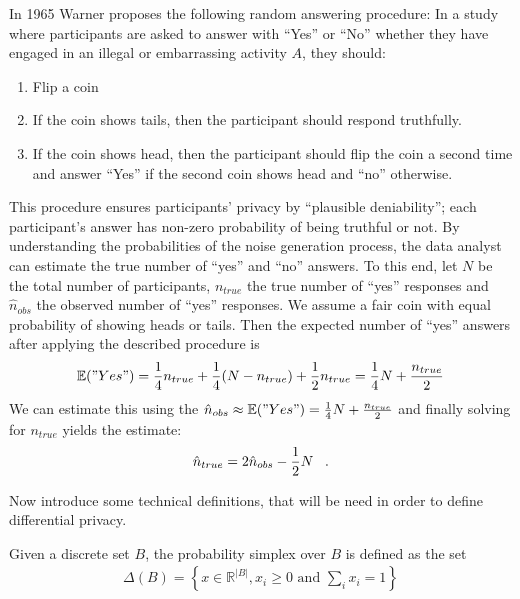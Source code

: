 \begin{ex} \label{ex:rand_resp}
    In 1965 Warner \parencite{stan65rr} proposes the following random answering procedure: In a study where participants are asked to answer with ``Yes'' or ``No'' whether they have engaged in an illegal or embarrassing activity $A$, they should:
    \begin{enumerate}
        \item Flip a coin
        \item If the coin shows tails, then the participant should respond truthfully.
        \item If the coin shows head, then the participant should flip the coin a second time and answer ``Yes'' if the second coin shows head and ``no'' otherwise.
    \end{enumerate}
    This procedure ensures participants' privacy by ``plausible deniability''; each participant's answer has non-zero probability of being truthful or not. By understanding the probabilities of the noise generation process, the data analyst can estimate the true number of ``yes'' and ``no'' answers. To this end, let $N$ be the total number of participants, $n_{true}$ the true number of ``yes'' responses and $\hat{n}_{obs}$ the observed number of ``yes'' responses. We assume a fair coin with equal probability of showing heads or tails. Then the expected number of ``yes'' answers after applying the described procedure is
    \begin{align}
        \mathbb{E}("Yes") = \frac{1}{4} n_{true} + \frac{1}{4} (N-n_{true}) + \frac{1}{2} n_{true} = \frac{1}{4} N + \frac{n_{true}}{2}
    \end{align}
    We can estimate this using the $\hat{n}_{obs} \approx \mathbb{E}("Yes") = \frac{1}{4} N + \frac{n_{true}}{2}$ and finally solving for $n_{true}$ yields the estimate:
    \begin{align}
        \hat{n}_{true} = 2 \hat{n}_{obs} - \frac{1}{2} N \;\;\;.
    \end{align}
\end{ex}

Now introduce some technical definitions, that will be need in order to define differential privacy.

\begin{definition}
    Given a discrete set $B$, the probability simplex over $B$ is defined as the set
    \begin{align}
        \Delta(B) = \left\{ x \in \mathbb{R}^{|B|}, x_i \ge 0 \text{ and } \sum_i x_i = 1  \right\}
    \end{align}
\end{definition}

